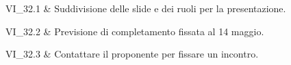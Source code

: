 VI\_32.1 & Suddivisione delle slide e dei ruoli per la presentazione.

\tabularnewline

VI\_32.2 & Previsione di completamento fissata al 14 maggio.

\tabularnewline

VI\_32.3 & Contattare il proponente per fissare un incontro.

